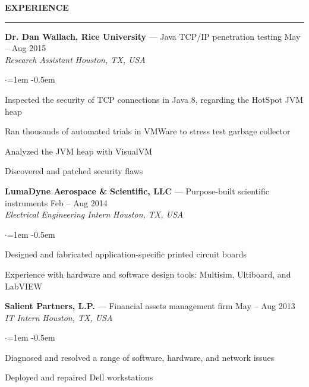 \documentclass[10pt, a4paper]{article}
\newenvironment{aSection}[1]{
    \medskip \textbf{\uppercase{#1}}
    \smallskip
    \hrule
    \begin{list}{}{
            \setlength{\leftmargin}{1.5em}
        }
    \item[]
    }{
    \end{list}
}
\newenvironment{aSubsection}[4]{
    {#1} \hfill {#2} \\
    \textit{#3} \hfill \textit{#4}
    \smallskip
    \begin{list}{$\cdot$}{\leftmargin=1em}
    \itemsep -0.5em \vspace{-0.5em}
    }{
    \end{list}
    \vspace{0.5em}
}
\begin{document}
\begin{aSection}{Experience}
    \begin{aSubsection}
        {\textbf{Dr. Dan Wallach, Rice University} --- Java TCP/IP penetration testing}
        {May -- Aug 2015}
        {Research Assistant}
        {Houston, TX, USA}
    \item Inspected the security of TCP connections in Java 8, regarding the HotSpot JVM heap
    \item Ran thousands of automated trials in VMWare to stress test garbage collector
    \item Analyzed the JVM heap with VisualVM
    \item Discovered and patched security flaws
    \end{aSubsection}

    \begin{aSubsection}
        {\textbf{LumaDyne Aerospace \& Scientific, LLC} --- Purpose-built scientific
        instruments}
        {Feb -- Aug 2014}
        {Electrical Engineering Intern}
        {Houston, TX, USA}
    \item Designed and fabricated application-specific printed circuit boards
    \item Experience with hardware and software design tools: Multisim, Ultiboard, and LabVIEW
    \end{aSubsection}

    \begin{aSubsection}
        {\textbf{Salient Partners, L.P.} --- Financial assets management firm}
        {May -- Aug 2013}
        {IT Intern}
        {Houston, TX, USA}
    \item Diagnosed and resolved a range of software, hardware, and network issues
    \item Deployed and repaired Dell workstations
    \end{aSubsection}
\end{aSection}
\end{document}
